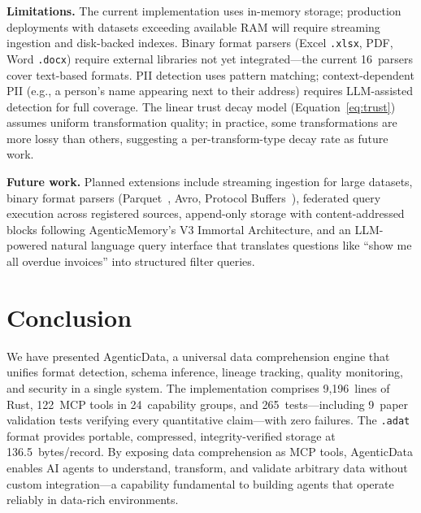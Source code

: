 \documentclass[10pt, twocolumn]{article}
\begin{document}
\textbf{Limitations.} The current implementation uses in-memory storage; production deployments with datasets exceeding available RAM will require streaming ingestion and disk-backed indexes. Binary format parsers (Excel \texttt{.xlsx}, PDF, Word \texttt{.docx}) require external libraries not yet integrated---the current 16~parsers cover text-based formats. PII detection uses pattern matching; context-dependent PII (e.g., a person's name appearing next to their address) requires LLM-assisted detection for full coverage. The linear trust decay model (Equation~\ref{eq:trust}) assumes uniform transformation quality; in practice, some transformations are more lossy than others, suggesting a per-transform-type decay rate as future work.

\textbf{Future work.} Planned extensions include streaming ingestion for large datasets, binary format parsers (Parquet~\cite{parquet2013}, Avro, Protocol Buffers~\cite{protobuf2008}), federated query execution across registered sources, append-only storage with content-addressed blocks following AgenticMemory's V3 Immortal Architecture, and an LLM-powered natural language query interface that translates questions like ``show me all overdue invoices'' into structured filter queries.


\section{Conclusion}\label{sec:conclusion}

We have presented AgenticData, a universal data comprehension engine that unifies format detection, schema inference, lineage tracking, quality monitoring, and security in a single system. The implementation comprises 9{,}196~lines of Rust, 122~MCP tools in 24~capability groups, and 265~tests---including 9~paper validation tests verifying every quantitative claim---with zero failures. The \texttt{.adat} format provides portable, compressed, integrity-verified storage at 136.5~bytes/record. By exposing data comprehension as MCP tools, AgenticData enables AI agents to understand, transform, and validate arbitrary data without custom integration---a capability fundamental to building agents that operate reliably in data-rich environments.



\end{document}
